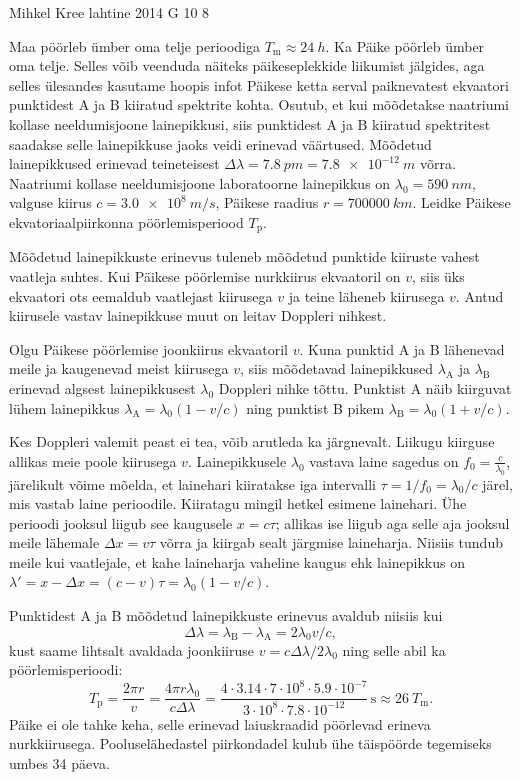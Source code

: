 {Mihkel Kree} %
{lahtine} %
{2014} %
{G 10} %
{8} %
{
\ifStatement
Maa pöörleb ümber oma telje perioodiga $T_\text{m}\approx\SI{24}{h}$. Ka Päike pöörleb ümber oma telje. Selles võib veenduda näiteks päikeseplekkide liikumist jälgides, aga selles ülesandes kasutame hoopis infot Päikese ketta serval paiknevatest ekvaatori punktidest A ja B kiiratud spektrite kohta. Osutub, et kui mõõdetakse naatriumi kollase neeldumisjoone lainepikkusi, siis punktidest A ja B kiiratud spektritest saadakse selle lainepikkuse jaoks veidi erinevad väärtused. Mõõdetud lainepikkused erinevad teineteisest $\Delta \lambda = \SI{7.8}{pm}=\SI{7.8e-12}{m}$ võrra. Naatriumi kollase neeldumisjoone laboratoorne lainepikkus on $\lambda_0=\SI{590}{nm}$, valguse kiirus $c=\SI{3.0e8}{m/s}$, Päikese raadius $r=\SI{700000}{km}$. Leidke Päikese ekvatoriaalpiirkonna pöörlemisperiood $T_\text{p}$.
\fi


\ifHint
Mõõdetud lainepikkuste erinevus tuleneb mõõdetud punktide kiiruste vahest vaatleja suhtes. Kui Päikese pöörlemise nurkkiirus ekvaatoril on $v$, siis üks ekvaatori ots eemaldub vaatlejast kiirusega $v$ ja teine läheneb kiirusega $v$. Antud kiirusele vastav lainepikkuse muut on leitav Doppleri nihkest.
\fi


\ifSolution
Olgu Päikese pöörlemise joonkiirus ekvaatoril $v$. Kuna punktid A ja B lähenevad meile ja kaugenevad meist kiirusega $v$, siis mõõdetavad lainepikkused $\lambda_\text{A}$ ja $\lambda_\text{B}$ erinevad algsest lainepikkusest $\lambda_0$ Doppleri nihke tõttu. Punktist A näib kiirguvat lühem lainepikkus $\lambda_\text{A}=\lambda_0(1-v/c)$ ning punktist B pikem $\lambda_\text{B}=\lambda_0(1+v/c)$.

Kes Doppleri valemit peast ei tea, võib arutleda ka järgnevalt. Liikugu kiirguse allikas meie poole kiirusega $v$. Lainepikkusele $\lambda_0$ vastava laine sagedus on $f_0=\frac{c}{\lambda_0}$, järelikult võime mõelda, et lainehari kiiratakse iga intervalli $\tau = 1/f_0 = \lambda_0/c$ järel, mis vastab laine perioodile. Kiiratagu mingil hetkel esimene lainehari. Ühe perioodi jooksul liigub see kaugusele $x=c\tau$; allikas ise liigub aga selle aja jooksul meile lähemale $\Delta x = v\tau$ võrra ja kiirgab sealt järgmise laineharja. Niisiis tundub meile kui vaatlejale, et kahe laineharja vaheline kaugus ehk lainepikkus on $\lambda'=x-\Delta x=(c-v)\tau = \lambda_0(1-v/c)$.

Punktidest A ja B mõõdetud lainepikkuste erinevus avaldub niisiis kui 
\[
\Delta\lambda = \lambda_\text{B}-\lambda_\text{A} = 2\lambda_0 v/c,
\]
kust saame lihtsalt avaldada joonkiiruse $v=c\Delta\lambda/2\lambda_0$ ning selle abil ka pöörlemisperioodi:
\[
T_\text{p}=\frac{2\pi r}{v}=\frac{4 \pi r \lambda_0}{c\Delta \lambda}=
\frac{4 \cdot 3.14 \cdot 7\cdot 10^8 \cdot 5.9 \cdot 10^{-7}}{3\cdot 10^8\cdot 7.8\cdot 10^{-12}}\,\text{s}\approx \SI{26}{\textit{T}_\text{m}}.
\]
Päike ei ole tahke keha, selle erinevad laiuskraadid pöörlevad erineva nurkkiirusega. Pooluselähedastel piirkondadel kulub ühe täispöörde tegemiseks umbes 34 päeva.
\fi


}
